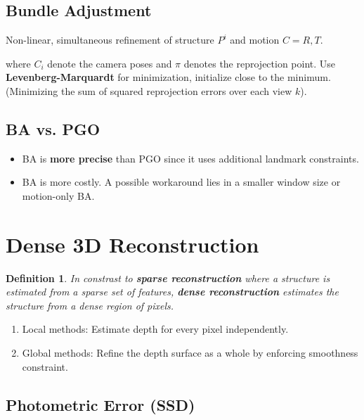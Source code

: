 \documentclass[10pt,a4paper]{scrartcl}
\newtheorem{define}{Definition}
\begin{document}
\begin{multicols*}{2}

\subsection{Bundle Adjustment}

Non-linear, simultaneous refinement of structure $P^i$ and motion $C=R,T$.


where $C_i$ denote the camera poses and $\pi$ denotes the reprojection point. Use \textbf{Levenberg-Marquardt} for minimization, initialize close to the minimum. (Minimizing the sum of squared reprojection errors over each view $k$).


\subsection{BA vs. PGO}

\begin{itemize}
\item BA is \textbf{more precise} than PGO since it uses additional landmark constraints.
\item BA is more costly. A possible workaround lies in a smaller window size or motion-only BA.
\end{itemize}

\section{Dense 3D Reconstruction}

\begin{define}
In constrast to \textbf{sparse reconstruction} where a structure is estimated from a sparse set of features, \textbf{dense reconstruction} estimates the structure from a dense region of pixels.
\end{define}

\begin{enumerate}
\item Local methods: Estimate depth for every pixel independently.
\item Global methods: Refine the depth surface as a whole by enforcing smoothness constraint.
\end{enumerate}

\subsection{Photometric Error (SSD)}


\end{multicols*}
\end{document}
